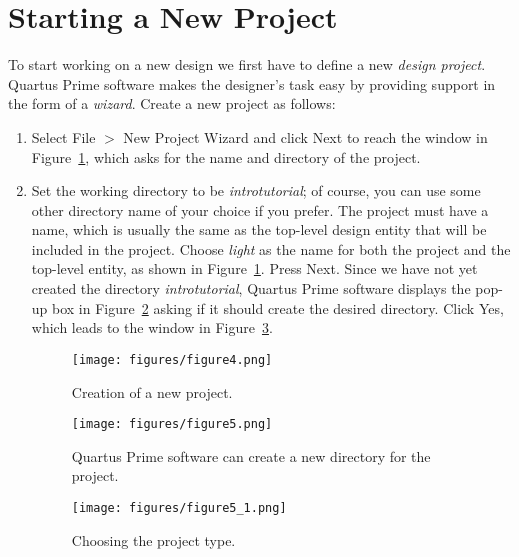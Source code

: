 \section{Starting a New Project}


To start working on a new design we first have to define a new 
{\it design project}.
Quartus Prime software makes the designer's task easy by providing support in the form
of a {\it wizard}.
Create a new project as follows:
\begin{enumerate}
\item Select {\sf File $>$ New Project Wizard} and click {\sf Next} to 
reach the window in Figure~\ref{fig:4},
which asks for the name and directory of the project.

\item Set the working directory to be {\it introtutorial};
of course, you can use some other directory name of your choice if you prefer.
The project must have a name, which is usually the same as the 
top-level design entity that will be included in the project.
Choose {\it light} as the name for both the project
and the top-level entity, as shown in Figure~\ref{fig:4}.  Press {\sf Next}. 
Since we have not yet created the directory {\it introtutorial},
Quartus Prime software displays the pop-up box in Figure~\ref{fig:5} asking if it should create
the desired directory. Click {\sf Yes}, which leads to
the window in Figure~\ref{fig:5_1}.

\begin{figure}[H]
   \begin{center}
      \texttt{[image: figures/figure4.png]}
   \caption{Creation of a new project.}
	 \label{fig:4}
	 \end{center}
\end{figure}

\begin{figure}[H]
   \begin{center}
      \texttt{[image: figures/figure5.png]}
   \caption{Quartus Prime software can create a new directory for the project.} 
	 \label{fig:5}
	 \end{center}
\end{figure}

\begin{figure}[H]
   \begin{center}
      \texttt{[image: figures/figure5\_1.png]}
   \caption{Choosing the project type.} 
	 \label{fig:5_1}
	 \end{center}
\end{figure}


\end{enumerate}
